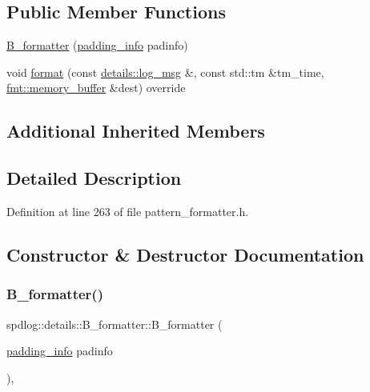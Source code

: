 \subsection*{Public Member Functions}
\begin{DoxyCompactItemize}
\item 
\hyperlink{classspdlog_1_1details_1_1_b__formatter_a2dde180e941a7b44a65b7967fec4d359}{B\+\_\+formatter} (\hyperlink{structspdlog_1_1details_1_1padding__info}{padding\+\_\+info} padinfo)
\item 
void \hyperlink{classspdlog_1_1details_1_1_b__formatter_a5f17328272b26d5d107e59bad150fac8}{format} (const \hyperlink{structspdlog_1_1details_1_1log__msg}{details\+::log\+\_\+msg} \&, const std\+::tm \&tm\+\_\+time, \hyperlink{format_8h_a21cbf729f69302f578e6db21c5e9e0d2}{fmt\+::memory\+\_\+buffer} \&dest) override
\end{DoxyCompactItemize}
\subsection*{Additional Inherited Members}


\subsection{Detailed Description}


Definition at line 263 of file pattern\+\_\+formatter.\+h.



\subsection{Constructor \& Destructor Documentation}
\mbox{\label{classspdlog_1_1details_1_1_b__formatter_a2dde180e941a7b44a65b7967fec4d359}} 
\subsubsection{\texorpdfstring{B\+\_\+formatter()}{B\_formatter()}}
{\footnotesize\ttfamily spdlog\+::details\+::\+B\+\_\+formatter\+::\+B\+\_\+formatter (\begin{DoxyParamCaption}\item[{\hyperlink{structspdlog_1_1details_1_1padding__info}{padding\+\_\+info}}]{padinfo }\end{DoxyParamCaption})\hspace{0.3cm}{\ttfamily [inline]}, {\ttfamily [explicit]}}



